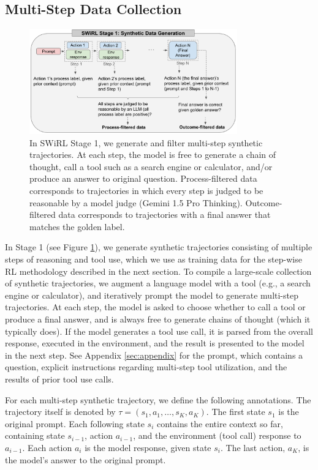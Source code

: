 \documentclass{article} %
\begin{document}
\subsection{Multi-Step Data Collection}\label{sec:synthetic-data-collection}

\begin{figure}[htbp!]
    \centering
    \includegraphics[width=0.8\textwidth]{syntheticdata.png}
    \caption{In SWiRL Stage 1, we generate and filter multi-step synthetic trajectories. At each step, the model is free to generate a chain of thought, call a tool such as a search engine or calculator, and/or produce an answer to original question. Process-filtered data corresponds to trajectories in which every step is judged to be reasonable by a model judge (Gemini 1.5 Pro Thinking). Outcome-filtered data corresponds to trajectories with a final answer that matches the golden label.}
    \label{fig:synthetic}
\end{figure}

In Stage 1 (see Figure \ref{fig:synthetic}), we generate synthetic trajectories consisting of multiple steps of reasoning and tool use, which we use as training data for the step-wise RL methodology described in the next section. To compile a large-scale collection of synthetic trajectories, we augment a language model with a tool (e.g., a search engine or calculator), and iteratively prompt the model to generate multi-step trajectories. At each step, the model is asked to choose whether to call a tool or produce a final answer, and is always free to generate chains of thought (which it typically does). If the model generates a tool use call, it is parsed from the overall response, executed in the environment, and the result is presented to the model in the next step. See Appendix \ref{sec:appendix} for the prompt, which contains a question, explicit instructions regarding multi-step tool utilization, and the results of prior tool use calls.

For each multi-step synthetic trajectory, we define the following annotations. The trajectory itself is denoted by \( \tau = (s_1, a_1, \dots, s_K, a_K) \). The first state $s_1$ is the original prompt. Each following state $s_i$ contains the entire context so far, containing state $s_{i-1}$, action $a_{i-1}$, and the environment (tool call) response to $a_{i-1}$. Each action $a_i$ is the model response, given state $s_i$. The last action, $a_K$, is the model's answer to the original prompt.
\end{document}
